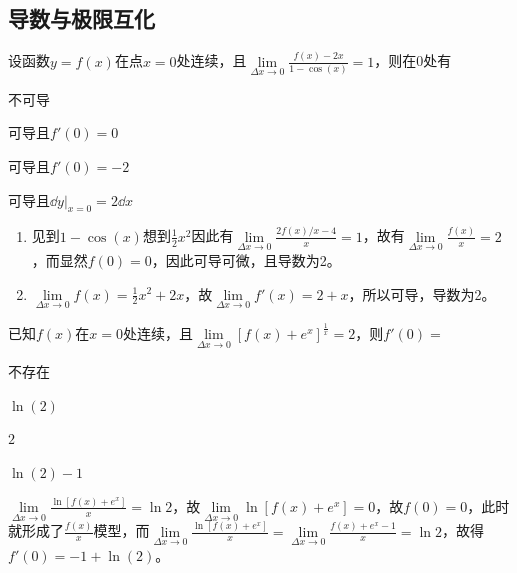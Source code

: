 \subsection{导数与极限互化}\label{sec:1.3.2}

\begin{problem}
	设函数$y=f(x)$在点$x=0$处连续，且$\underset{\Delta x\rightarrow 0}{\lim}\frac{f(x)-2x}{1-\cos(x)}=1$，则在0处有\xparen
	
	\begin{xchoices}[showanswer = true]
		\item 不可导
		\item 可导且$f'(0)=0$
		\item 可导且$f'(0)=-2$
		\item* 可导且$\dd y\big|_{x=0} = 2\dd x$
	\end{xchoices}
	\vspace{0.5em}
	\begin{solution}
		\begin{enumerate}[label=(\Roman*)]
			\item 见到$1-\cos(x)$想到$\frac{1}{2}x^2$因此有$\underset{\Delta x\rightarrow 0}{\lim}\frac{2f(x)/x-4}{x}=1$，故有$\underset{\Delta x\rightarrow 0}{\lim}\frac{f(x)}{x}=2$，而显然$f(0)=0$，因此可导可微，且导数为2。
			\item $\underset{\Delta x\rightarrow 0}{\lim}f(x)=\frac{1}{2}x^2+2x$，故$\underset{\Delta x\rightarrow 0}{\lim}f'(x)=2+x$，所以可导，导数为2。
		\end{enumerate}
	\end{solution}
\end{problem}

\begin{problem}
	已知$f(x)$在$x=0$处连续，且$\underset{\Delta x\rightarrow 0}{\lim}[f(x)+e^x]^{\frac{1}{x}}=2$，则$f'(0)=$\xparen
	\begin{xchoices}[showanswer = true]
		\item 不存在
		\item $\ln(2)$
		\item $2$
		\item* $\ln(2)-1$
	\end{xchoices}
\vspace{0.9em}
    \begin{solution}
    	$\underset{\Delta x\rightarrow 0}{\lim}\frac{\ln[f(x)+e^x]}{x}=\ln2$，故$\underset{\Delta x\rightarrow 0}{\lim}\ln[f(x)+e^x]=0$，故$f(0)=0$，此时就形成了$\frac{f(x)}{x}$模型，而$\underset{\Delta x\rightarrow 0}{\lim}\frac{\ln[f(x)+e^x]}{x}=\underset{\Delta x\rightarrow 0}{\lim}\frac{f(x)+e^x-1}{x}=\ln2$，故得$f'(0)=-1+\ln(2)$。
    \end{solution}
\end{problem}

